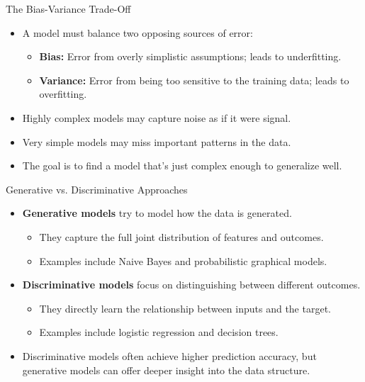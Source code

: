 \documentclass[aspectratio=169,xcolor=dvipsnames]{beamer}
\begin{document}
\begin{frame}{The Bias-Variance Trade-Off}

\begin{itemize}
  \item A model must balance two opposing sources of error:
  \begin{itemize}
    \item \textbf{Bias:} Error from overly simplistic assumptions; leads to underfitting.
    \item \textbf{Variance:} Error from being too sensitive to the training data; leads to overfitting.
  \end{itemize}
  \item Highly complex models may capture noise as if it were signal.
  \item Very simple models may miss important patterns in the data.
  \item The goal is to find a model that's just complex enough to generalize well.
\end{itemize}

\end{frame}

\begin{frame}{Generative vs. Discriminative Approaches}

\begin{itemize}
  \item \textbf{Generative models} try to model how the data is generated.
  \begin{itemize}
    \item They capture the full joint distribution of features and outcomes.
    \item Examples include Naive Bayes and probabilistic graphical models.
  \end{itemize}

  \item \textbf{Discriminative models} focus on distinguishing between different outcomes.
  \begin{itemize}
    \item They directly learn the relationship between inputs and the target.
    \item Examples include logistic regression and decision trees.
  \end{itemize}

  \item Discriminative models often achieve higher prediction accuracy, but generative models can offer deeper insight into the data structure.
\end{itemize}

\end{frame}
\end{document}
